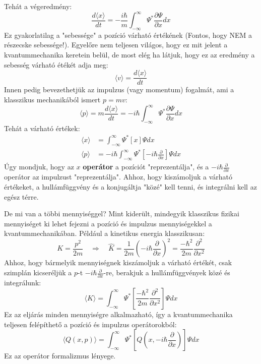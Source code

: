 \documentclass[../main.tex]{subfiles}
\begin{document}
Tehát a végeredmény:
\begin{equation}
    \frac{d \langle x \rangle}{dt} = -\frac{i \hbar}{m} \int_{-\infty}^{\infty} \Psi^* \frac{\partial \Psi}{\partial x} dx
\end{equation}
Ez gyakorlatilag a "sebessége" a pozíció várható értékének (Fontos, hogy NEM a részecske sebessége!). Egyelőre nem teljesen világos, hogy ez mit jelent a kvantummechanika keretein belül,
de most elég ha látjuk, hogy ez az eredmény a sebesség várható étékét adja meg:
\begin{equation}
    \langle v \rangle = \frac{d \langle x \rangle}{dt}
\end{equation}
Innen pedig bevezethetjük az impulzus (vagy momentum) fogalmát, ami a klasszikus mechanikából ismert $p = mv$:
\begin{equation}
    \boxed{\langle p \rangle = m \frac{d \langle x \rangle}{dt} = -i \hbar \int_{-\infty}^{\infty} \Psi^* \frac{\partial \Psi}{\partial x} dx}
\end{equation}
Tehát a várható értékek:
\begin{equation}
    \begin{aligned}
        \langle x \rangle &= \int_{-\infty}^{\infty} \Psi^*\left[x\right]\Psi  dx \\
        \langle p \rangle &= -i \hbar \int_{-\infty}^{\infty} \Psi^* \left[-i\hbar \frac{\partial}{\partial x}\right] \Psi dx
    \end{aligned}
\end{equation}
Úgy mondjuk, hogy az $x$ \textbf{operátor} a pozíciót "reprezentálja", és a $-i \hbar \frac{\partial}{\partial x}$ operátor az impulzust "reprezentálja". Ahhoz, hogy kiszámoljuk a várható értékeket,
a hullámfüggvény és a konjugáltja "közé" kell tenni, és integrálni kell az egész térre.

De mi van a többi mennyiséggel? Mint kiderült, mindegyik klasszikus fizikai mennyiséget ki lehet fejezni a pozíció és impulzus mennyiségekkel a kvantummechanikában. Például a kinetikus energia klasszikusan:
\begin{equation}
    K = \frac{p^2}{2m} \quad \Rightarrow \quad \hat{K} = \frac{1}{2m} \left(-i \hbar \frac{\partial}{\partial x}\right)^2 = \frac{-\hbar^2}{2m} \frac{\partial^2}{\partial x^2}
\end{equation}
Ahhoz, hogy bármelyik mennyiségnek kiszámoljuk a várható értékét, csak szimplán kicseréljük a $p$-t $-i \hbar \frac{\partial}{\partial x}$-re, berakjuk a hullámfüggvények közé és integrálunk:
\begin{equation}
    \langle K \rangle = \int_{-\infty}^{\infty} \Psi^* \left[ \frac{-\hbar^2}{2m} \frac{\partial^2}{\partial x^2} \right] \Psi dx
\end{equation}
Ez az eljárás minden mennyiségre alkalmazható, így a kvantummechanika teljesen felépíthető a pozíció és impulzus operátorokból:
\begin{equation}
    \langle Q(x,p) \rangle = \int_{-\infty}^{\infty} \Psi^* \left[ Q\left(x, -i \hbar \frac{\partial}{\partial x}\right) \right] \Psi dx
\end{equation}
Ez az operátor formalizmus lényege.
\end{document}
